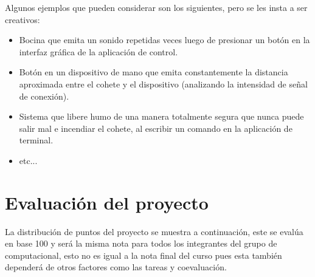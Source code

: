 ﻿\documentclass[letterpaper]{article}
\begin{document}
Algunos ejemplos que pueden considerar son los siguientes, pero se les insta a ser creativos:
\begin{itemize}
    \item Bocina que emita un sonido repetidas veces luego de presionar un botón en la interfaz
        gráfica de la aplicación de control.
    \item Botón en un dispositivo de mano que emita constantemente la distancia aproximada entre
        el cohete y el dispositivo (analizando la intensidad de señal de conexión).
    \item Sistema que libere humo de una manera totalmente segura que nunca puede salir mal e
        incendiar el cohete, al escribir un comando en la aplicación de terminal.
    \item etc...
\end{itemize}

\section{Evaluación del proyecto}
La distribución de puntos del proyecto se muestra a continuación, este se evalúa en base 100 y será
la misma nota para todos los integrantes del grupo de computacional, esto no es igual a la nota
final del curso pues esta también dependerá de otros factores como las tareas y coevaluación. 
\end{document}
